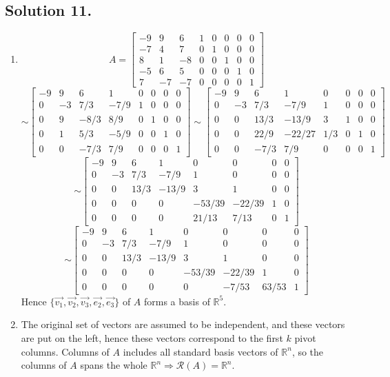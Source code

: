 \documentclass{article}
\begin{document}
\subsection*{Solution 11.}
\begin{enumerate}
    \item 
    \[A=\left[\begin{array}{rrrrrrrr}-9&9&6&1&0&0&0&0\\-7&4&7&0&1&0&0&0\\8&1&-8&0&0&1&0&0\\-5&6&5&0&0&0&1&0\\7&-7&-7&0&0&0&0&1\end{array}\right]\]
    \[\sim\left[\begin{array}{rrrrrrrr}-9&9&6&1&0&0&0&0\\0&-3&7/3&-7/9&1&0&0&0\\0&9&-8/3&8/9&0&1&0&0\\0&1&5/3&-5/9&0&0&1&0\\0&0&-7/3&7/9&0&0&0&1\end{array}\right]\sim\left[\begin{array}{rrrrrrrr}-9&9&6&1&0&0&0&0\\0&-3&7/3&-7/9&1&0&0&0\\0&0&13/3&-13/9&3&1&0&0\\0&0&22/9&-22/27&1/3&0&1&0\\0&0&-7/3&7/9&0&0&0&1\end{array}\right]\]
    \[\sim\left[\begin{array}{rrrrrrrr}-9&9&6&1&0&0&0&0\\0&-3&7/3&-7/9&1&0&0&0\\0&0&13/3&-13/9&3&1&0&0\\0&0&0&0&-53/39&-22/39&1&0\\0&0&0&0&21/13&7/13&0&1\end{array}\right]\]
    \[\sim\left[\begin{array}{rrrrrrrr}-9&9&6&1&0&0&0&0\\0&-3&7/3&-7/9&1&0&0&0\\0&0&13/3&-13/9&3&1&0&0\\0&0&0&0&-53/39&-22/39&1&0\\0&0&0&0&0&-7/53&63/53&1\end{array}\right]\]
    Hence $\{\Vec{v_1},\Vec{v_2},\Vec{v_3},\Vec{e_2},\Vec{e_3}\}$ of $A$ forms a basis of $\mathbb{R}^5$.
    \item The original set of vectors are assumed to be independent, and these vectors are put on the left, hence these vectors correspond to the first $k$ pivot columns. Columns of $A$ includes all standard basis vectors of $\mathbb{R}^n$, so the columns of $A$ spans the whole $\mathbb{R}^n \Rightarrow \mathcal{R}(A)=\mathbb{R}^n$.
\end{enumerate}
\end{document}
